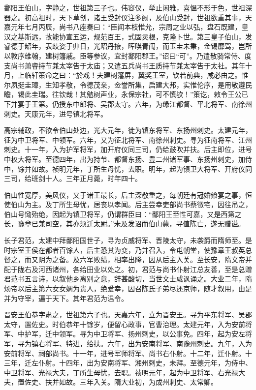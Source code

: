 \documentclass[]{article}
\begin{document}
鄱阳王伯山，字静之，世祖第三子也。伟容仪，举止闲雅，喜愠不形于色，世祖深器之。初高祖时，天下草创，诸王受封仪注多阙，及伯山受封，世祖欲重其事，天嘉元年七月丙辰，尚书八座奏曰：``臣闻本枝惟允，宗周之业以弘，盘石既建，皇汉之基斯远，故能协宣五运，规范百王，式固灵根，克隆卜世。第三皇子伯山，发睿德于龆年，表歧姿于丱日，光昭丹掖，晖暎青闱，而玉圭未秉，金锡靡驾，岂所以敦序维翰，建树籓戚。臣等参议，宜封鄱阳郡王。''诏曰``可''。乃遣散骑常侍、度支尚书萧睿持节兼太宰告于太庙；又遣五兵尚书王质持节兼太宰告于太社。其年十月，上临轩策命之曰：``於戏！夫建树籓屏，翼奖王室，钦若前典，咸必由之。惟尔夙挺圭璋，生知孝敬，令德茂亲，佥誉所集，启建大邦，实惟伦序，是用敬遵民瞻，锡此圭瑞。往钦哉！其勉树声业，永保宗社，可不慎欤！''策讫，敕令王公已下并宴于王第。仍授东中郎将、吴郡太守。六年，为缘江都督、平北将军、南徐州刺史。天康元年，进号镇北将军。

高宗辅政，不欲令伯山处边，光大元年，徙为镇东将军、东扬州刺史。太建元年，征为中卫将军、中领军。六年，又为征北将军、南徐州刺史。寻为征南将军、江州刺史。十一年，入为护军将军，加开府仪同三司，仍给鼓吹并扶。后主即位，进号中权大将军。至德四年，出为持节、都督东扬、豊二州诸军事、东扬州刺史，加侍中，馀并如故。祯明元年，丁所生母忧，去职。明年，起为镇卫大将军、开府仪同三司，给班剑十人。三年正月薨，时年四十。

伯山性宽厚，美风仪，又于诸王最长，后主深敬重之，每朝廷有冠婚飨宴之事，恒使伯山为主。及丁所生母忧，居丧以孝闻。后主尝幸吏部尚书蔡徵宅，因往吊之，伯山号恸殆绝，因起为镇卫将军，仍谓群臣曰：``鄱阳王至性可嘉，又是西第之长，豫章已兼司空，其亦须迁太尉。''未及发诏而伯山薨，寻值陈亡，遂无赠谥。

长子君范，太建中拜鄱阳国世子，寻为贞威将军、晋陵太守，未袭爵而隋师至。是时宗室王侯在都者百馀人，后主恐其为变，乃并召入，令屯朝堂，使豫章王叔英总督之，而又阴为之备。及六军败绩，相率出降，因从后主入关。至长安，隋文帝并配于陇右及河西诸州，各给田业以处之。初，君范与尚书仆射江总友善，至是总赠君范书五言诗，以叙他乡离别之意，辞甚酸切，当世文士咸讽诵之。大业二年，隋炀帝以后主第六女女婤为贵人，绝爱幸，因召陈氏子弟尽还京师，随才叙用，由是并为守宰，遍于天下。其年君范为温令。

晋安王伯恭字肃之，世祖第六子也。天嘉六年，立为晋安王。寻为平东将军、吴郡太守，置佐史。时伯恭年十馀岁，便留心政事，官曹治理。太建元年，入为安前将军、中护军，迁中领军。寻为中卫将军、扬州刺史，以公事免。四年，起为安左将军，寻为镇右将军、特进，给扶。六年，出为安南将军、南豫州刺史。九年，入为安前将军、祠部尚书。十一年，进号军师将军、尚书右仆射。十二年，迁仆射。十三年，迁左仆射。十四年，出为安南将军、湘州剌史，未拜。至德元年，为侍中、中卫将军、光禄大夫，丁所生母忧，去职。祯明元年，起为中卫将军、右光禄大夫，置佐史、扶并如故。三年入关。隋大业初，为成州刺史、太常卿。
\end{document}
